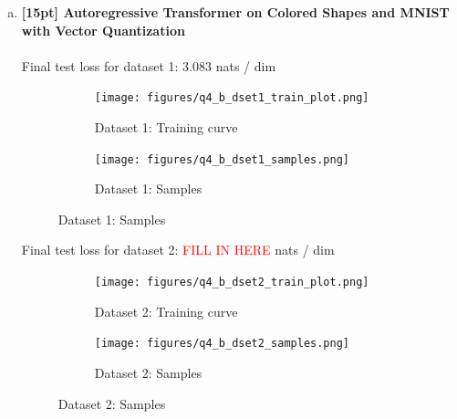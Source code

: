 \documentclass{article}
\begin{document}
\begin{enumerate}[(a)]
\item {\bf [15pt] Autoregressive Transformer on Colored Shapes and MNIST with Vector Quantization} \\\\
Final test loss for dataset 1: 3.083 nats / dim
\begin{figure}[H]
    \centering
    \begin{subfigure}{0.45\textwidth}
        \centering
        \texttt{[image: figures/q4\_b\_dset1\_train\_plot.png]}
        \caption{Dataset 1: Training curve}
    \end{subfigure}
    \hspace{0.2in}
    \begin{subfigure}{0.45\textwidth}
        \centering
        \texttt{[image: figures/q4\_b\_dset1\_samples.png]}
        \caption{Dataset 1: Samples}
    \end{subfigure}
\end{figure}
Final test loss for dataset 2: \textcolor{red}{FILL IN HERE}  nats / dim
\begin{figure}[H]
    \centering
    \begin{subfigure}{0.45\textwidth}
        \centering
        \texttt{[image: figures/q4\_b\_dset2\_train\_plot.png]}
        \caption{Dataset 2: Training curve}
    \end{subfigure}
    \hspace{0.2in}
    \begin{subfigure}{0.45\textwidth}
        \centering
        \texttt{[image: figures/q4\_b\_dset2\_samples.png]}
        \caption{Dataset 2: Samples}
    \end{subfigure}
\end{figure}

\end{enumerate}

\newpage
{}
\end{document}
